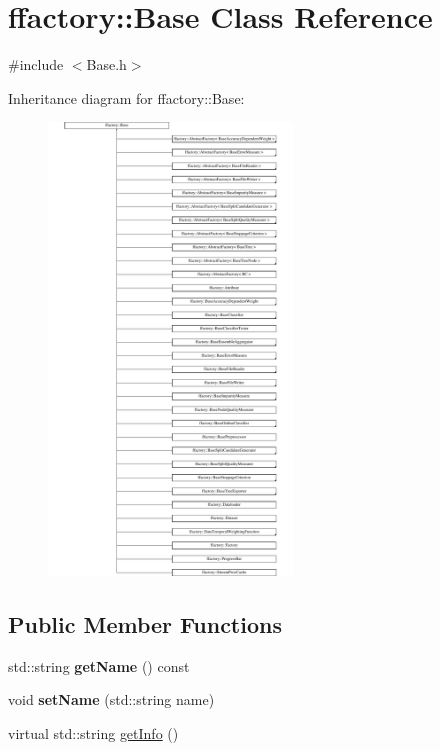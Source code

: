 \hypertarget{classffactory_1_1_base}{\section{ffactory\-:\-:Base Class Reference}
\label{classffactory_1_1_base}
}


{\ttfamily \#include $<$Base.\-h$>$}

Inheritance diagram for ffactory\-:\-:Base\-:\begin{figure}[H]
\begin{center}
\leavevmode
\includegraphics[height=12.000000cm]{classffactory_1_1_base}
\end{center}
\end{figure}
\subsection*{Public Member Functions}
\begin{DoxyCompactItemize}
\item 
\hypertarget{classffactory_1_1_base_a4330edb86dc9a45905cca6c56947566f}{std\-::string {\bfseries get\-Name} () const }\label{classffactory_1_1_base_a4330edb86dc9a45905cca6c56947566f}

\item 
\hypertarget{classffactory_1_1_base_a35832a4e794f5393df77d266cf073a03}{void {\bfseries set\-Name} (std\-::string name)}\label{classffactory_1_1_base_a35832a4e794f5393df77d266cf073a03}

\item 
virtual std\-::string \hyperlink{classffactory_1_1_base_a061e6165abeadad3fac626253d14a0c6}{get\-Info} ()
\end{DoxyCompactItemize}
